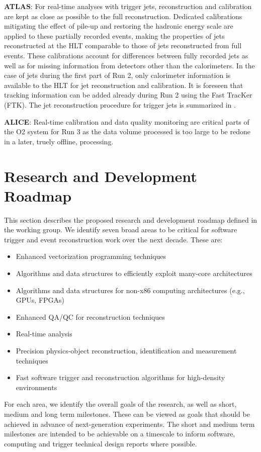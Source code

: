 \vskip 0.5cm
\noindent
{\bf ATLAS}: For real-time analyses with trigger jets, reconstruction and calibration are  kept as close as possible to the full reconstruction. 
Dedicated calibrations mitigating the effect of pile-up and restoring the hadronic energy scale are applied to these partially recorded events, making the properties of jets reconstructed at 
the HLT comparable to those of jets reconstructed from full events. These calibrations account for differences between fully recorded jets as well as for missing information from detectors 
other than the calorimeters. In the case of jets during the first part of Run 2, only calorimeter information is available to the HLT for jet reconstruction and calibration. It is foreseen 
that tracking information can be added already during Run 2 using the Fast TracKer (FTK). The jet reconstruction procedure for trigger jets is summarized in \cite{Abreu2014}. 

\vskip 0.5cm
\noindent
{\bf ALICE}: Real-time calibration and data quality monitoring are critical parts of the O2 system for Run 3 as the data volume processed is too large to be redone in a later, truely offline, processing.

\section{Research and Development Roadmap}

This section describes the proposed research and development roadmap defined in the working group. We identify seven broad areas to be critical for software trigger and event reconstruction 
work over the next decade. These  are:
\begin{itemize}
\item Enhanced vectorization programming techniques
\item Algorithms and data structures to efficiently exploit many-core architectures
\item Algorithms and data structures for non-x86 computing architectures (e.g., GPUs, FPGAs)
\item Enhanced QA/QC for reconstruction techniques
\item Real-time analysis
\item Precision physics-object reconstruction, identification and measurement techniques
\item Fast software trigger and reconstruction algorithms for high-density environments
\end{itemize}
For each area, we identify the overall goals of the research, as well as short, medium and long term milestones. These can be viewed as goals that should be achieved in advance of next-generation 
experiments. The short and medium term milestones are intended to be achievable on a timescale to inform software, computing and trigger technical design reports where possible.

